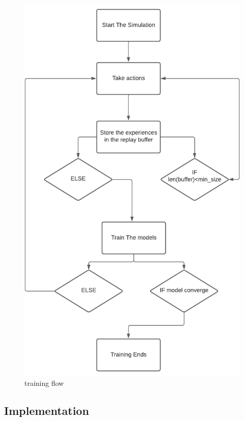 \documentclass[12pt]{extarticle}
\begin{document}
 \begin{figure}[h!]  
\centering
\includegraphics[scale=2]{training_workflow3}
\caption[training flow]{training flow}
\end{figure}


\afterpage{\clearpage}

\newpage
\pagebreak
\hspace{0pt}
\vfill
\begin{center}
\section{Implementation}
\end{center}
\vfill
\hspace{0pt}
\end{document}
